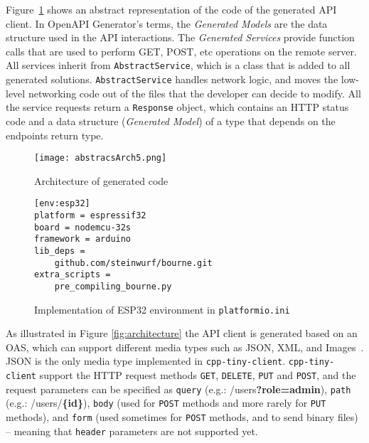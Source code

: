 \documentclass[manuscript,screen]{acmart}
\begin{document}
Figure~\ref{fig:abstract_architecture} shows an abstract representation of the code of the generated API client. In OpenAPI Generator's terms, the {\em Generated Models} are the data structure used in the API interactions. The {\em Generated Services} provide function calls that are used to perform GET, POST, etc operations on the remote server. All services inherit from \texttt{AbstractService}, which is a class that is added to all generated solutions. 
\texttt{AbstractService} handles network logic, and moves the low-level networking code out of the files that the developer can decide to modify. All the service requests return a \texttt{Response} object, which contains an HTTP status code and a data structure ({\em Generated Model}) of a type that depends on the endpoints return type. 

\begin{figure}[t!]
 \centering
    \texttt{[image: abstracsArch5.png]}
    \caption{Architecture of generated code}
    \label{fig:abstract_architecture}
\end{figure}


\begin{figure}[b!]
\begin{verbatim}
[env:esp32]
platform = espressif32
board = nodemcu-32s
framework = arduino
lib_deps =
    github.com/steinwurf/bourne.git
extra_scripts = 
    pre_compiling_bourne.py
\end{verbatim}
\caption{Implementation of ESP32 environment in \texttt{platformio.ini}}
\label{fig:ESP32_environment}
\end{figure}



As illustrated in Figure \ref{fig:architecture} the API client is generated based on an OAS, which can support different media types such as JSON, XML, and Images~\cite{OpenAPIMediaTypes}. JSON is the only media type implemented in \texttt{cpp-tiny-client}. %
%
\texttt{cpp-tiny-client} support the HTTP request methods \texttt{GET}, \texttt{DELETE}, \texttt{PUT} and \texttt{POST}, and the request parameters can be specified as \texttt{query} (e.g.: /users{\bf?role=admin}), \texttt{path} (e.g.: /users/{\bf\{id\}}), \texttt{body} (used for \texttt{POST} methods and more rarely for \texttt{PUT} methods), and \texttt{form} (used sometimes for \texttt{POST} methods, and to send binary files) -- meaning that \texttt{header} parameters are not supported yet. 
\end{document}
